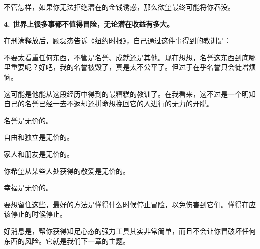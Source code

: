 不管怎样，如果你无法拒绝潜在的金钱诱惑，那么欲望最终可能将你吞没。

\textbf{4. 世界上很多事都不值得冒险，无论潜在收益有多大。}

在刑满释放后，顾磊杰告诉《纽约时报》，自己通过这件事得到的教训是：

{\kaishu

不要太看重任何东西，不管是名誉、成就还是其他。现在想想，名誉这东西到底哪里重要呢？好吧，我的名誉被毁了，真是太不公平了。但过于在乎名誉只会徒增烦恼。

}

这可能是他能从这段经历中得到的最糟糕的教训了。在我看来，这不过是一个明知自己的名誉已经一去不返却还拼命想挽回它的人进行的无力的开脱。

名誉是无价的。

自由和独立是无价的。

家人和朋友是无价的。

你希望从某些人处获得的敬爱是无价的。

幸福是无价的。

要想留住这些，最好的方法是懂得什么时候停止冒险，以免伤害到它们。懂得在应该停止的时候停止。

好消息是，帮你获得知足心态的强力工具其实非常简单，而且不会让你冒破坏任何东西的风险。它就是我们下一章的主题。
